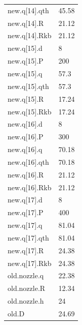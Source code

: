 {\begin{longtable}{p{}p{}}
{}new.q[14].qth & 45.58\\
{}new.q[14].R & 21.12\\
{}new.q[14].Rkb & 21.12\\
{}new.q[15].d & 8\\
{}new.q[15].P & 200\\
{}new.q[15].q & 57.3\\
{}new.q[15].qth & 57.3\\
{}new.q[15].R & 17.24\\
{}new.q[15].Rkb & 17.24\\
{}new.q[16].d & 8\\
{}new.q[16].P & 300\\
{}new.q[16].q & 70.18\\
{}new.q[16].qth & 70.18\\
{}new.q[16].R & 21.12\\
{}new.q[16].Rkb & 21.12\\
{}new.q[17].d & 8\\
{}new.q[17].P & 400\\
{}new.q[17].q & 81.04\\
{}new.q[17].qth & 81.04\\
{}new.q[17].R & 24.38\\
{}new.q[17].Rkb & 24.38\\
{}old.nozzle.q & 22.38\\
{}old.nozzle.R & 12.34\\
{}old.nozzle.h & 24\\
{}old.D & 24.69\\
\bottomrule\end{longtable}}

